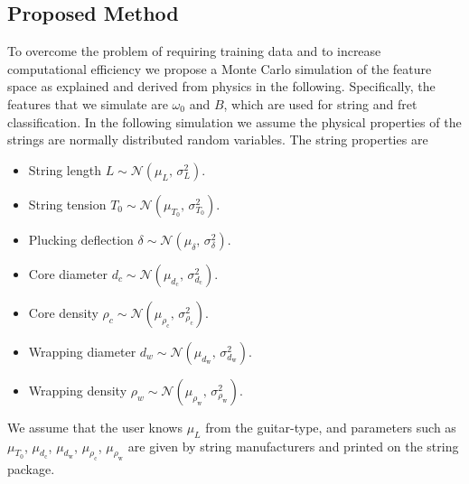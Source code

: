 \documentclass{article}
\begin{document}
\begin{sloppy}
%
%
\section{Proposed Method}
%
To overcome the problem of requiring training data and to increase computational efficiency we propose a  Monte Carlo simulation of the feature space as explained and derived from physics in the following. Specifically, the features that we simulate are ${\omega}_0$ and $B$, which are used for string and fret classification. In the following simulation we assume the physical properties of the strings are normally distributed random variables. The string properties are
\begin{itemize}
    \item String length $L \sim \mathcal{N}(\mu_{L}, \,\sigma_{L}^{2} ) $.
    \item String tension $T_0 \sim \mathcal{N}(\mu_{T_0},\,\sigma_{T_0}^{2})$.
    \item Plucking deflection $\delta \sim \mathcal{N}(\mu_{\delta},\,\sigma_{\delta}^{2})$.

    \item Core diameter $ d_c \sim \mathcal{N}(\mu_{d_\text{c}},\,\sigma_{d_\text{c}}^{2})$.
    \item Core density $ \rho_c \sim \mathcal{N}(\mu_{\rho_\text{c}},\,\sigma_{\rho_\text{c}}^{2})$.
    \item Wrapping diameter $ d_w \sim \mathcal{N}(\mu_{d_\text{w}},\,\sigma_{d_\text{w}}^{2})$.
    \item Wrapping density $\rho_w \sim \mathcal{N}(\mu_{\rho_\text{w}},\,\sigma_{\rho_\text{w}}^{2})$.

\end{itemize}
%
We assume that the user knows $\mu_L$ from the guitar-type, and parameters such as $\mu_{T_0}$, $\mu_{d_\text{c}}$, $\mu_{d_\text{w}}$, $\mu_{\rho_\text{c}}$, $\mu_{\rho_\text{w}}$ are given by string manufacturers and printed on the string package.
%
%
%
%
%
%


\end{sloppy}
\end{document}
